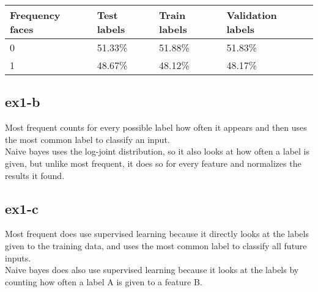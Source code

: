 \begin{table}[!htbp]
\centering
\begin{tabular}{|l||l|l|l|}
\hline
Frequency faces & Test labels   & Train labels & Validation labels \\ \hline
0 & 51.33\% & 51.88\% & 51.83\% \\ \hline
1 & 48.67\% & 48.12\% & 48.17\% \\ \hline
\end{tabular}
\end{table}

\subsection{ex1-b}
Most frequent counts for every possible label how often it appears and then uses the most
common label to classify an input.\\
Naive bayes uses the log-joint distribution, so it also looks at how often a label is given,
but unlike most frequent, it does so for every feature and normalizes the results it found.

\subsection{ex1-c}
Most frequent does use supervised learning because it directly looks at the labels given 
to the training data, and uses the most common label to classify all future inputs.\\
Naive bayes does also use supervised learning because it looks at the labels by counting 
how often a label A is given to a feature B.
